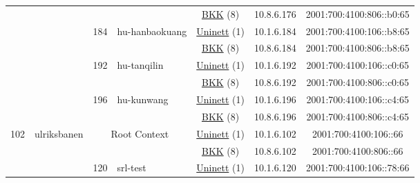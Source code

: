 \begin{small}
\begin{center}
\begin{longtable}{|c|c|c|c|c|c|c|c|}
  &  &  &  & \multicolumn{2}{|c|}{\tiny{\href{http://bkk.no}{BKK} (8)}} & \tiny{10.8.6.176} & \tiny{2001:700:4100:806::b0:65} \\* \cline{3-3}\cline{4-4}\cline{5-5}\cline{6-6}\cline{7-7}\cline{8-8}
  &  & \multirow{2}{*}{\tiny{184}} & \multicolumn{1}{|l|}{\multirow{2}{*}{\tiny{hu-hanbaokuang}}} & \multicolumn{2}{|c|}{\tiny{\href{https://www.uninett.no}{Uninett} (1)}} & \tiny{10.1.6.184} & \tiny{2001:700:4100:106::b8:65} \\* \cline{5-5}\cline{6-6}\cline{7-7}\cline{8-8}
  &  &  &  & \multicolumn{2}{|c|}{\tiny{\href{http://bkk.no}{BKK} (8)}} & \tiny{10.8.6.184} & \tiny{2001:700:4100:806::b8:65} \\* \cline{3-3}\cline{4-4}\cline{5-5}\cline{6-6}\cline{7-7}\cline{8-8}
  &  & \multirow{2}{*}{\tiny{192}} & \multicolumn{1}{|l|}{\multirow{2}{*}{\tiny{hu-tanqilin}}} & \multicolumn{2}{|c|}{\tiny{\href{https://www.uninett.no}{Uninett} (1)}} & \tiny{10.1.6.192} & \tiny{2001:700:4100:106::c0:65} \\* \cline{5-5}\cline{6-6}\cline{7-7}\cline{8-8}
  &  &  &  & \multicolumn{2}{|c|}{\tiny{\href{http://bkk.no}{BKK} (8)}} & \tiny{10.8.6.192} & \tiny{2001:700:4100:806::c0:65} \\* \cline{3-3}\cline{4-4}\cline{5-5}\cline{6-6}\cline{7-7}\cline{8-8}
  &  & \multirow{2}{*}{\tiny{196}} & \multicolumn{1}{|l|}{\multirow{2}{*}{\tiny{hu-kunwang}}} & \multicolumn{2}{|c|}{\tiny{\href{https://www.uninett.no}{Uninett} (1)}} & \tiny{10.1.6.196} & \tiny{2001:700:4100:106::c4:65} \\* \cline{5-5}\cline{6-6}\cline{7-7}\cline{8-8}
  &  &  &  & \multicolumn{2}{|c|}{\tiny{\href{http://bkk.no}{BKK} (8)}} & \tiny{10.8.6.196} & \tiny{2001:700:4100:806::c4:65} \\ \hline
 \multirow{28}{*}{\tiny{102}} & \multicolumn{1}{|l|}{\multirow{28}{*}{\tiny{ulriksbanen}}} & \multicolumn{2}{|c|}{\multirow{2}{*}{\tiny{Root Context}}} & \multicolumn{2}{|c|}{\tiny{\href{https://www.uninett.no}{Uninett} (1)}} & \tiny{10.1.6.102} & \tiny{2001:700:4100:106::66} \\* \cline{5-5}\cline{6-6}\cline{7-7}\cline{8-8}
  &  & \multicolumn{2}{|c|}{} & \multicolumn{2}{|c|}{\tiny{\href{http://bkk.no}{BKK} (8)}} & \tiny{10.8.6.102} & \tiny{2001:700:4100:806::66} \\* \cline{3-3}\cline{4-4}\cline{5-5}\cline{6-6}\cline{7-7}\cline{8-8}
  &  & \multirow{2}{*}{\tiny{120}} & \multicolumn{1}{|l|}{\multirow{2}{*}{\tiny{srl-test}}} & \multicolumn{2}{|c|}{\tiny{\href{https://www.uninett.no}{Uninett} (1)}} & \tiny{10.1.6.120} & \tiny{2001:700:4100:106::78:66} \\* \cline{5-5}\cline{6-6}\cline{7-7}\cline{8-8}

\end{longtable}
\end{center}
\end{small}
